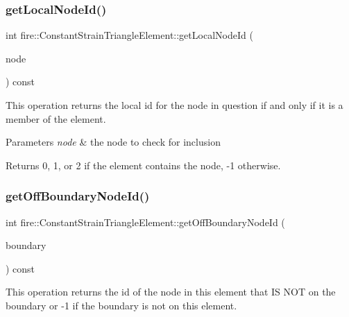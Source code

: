 \subsubsection{\texorpdfstring{get\+Local\+Node\+Id()}{getLocalNodeId()}}
{\footnotesize\ttfamily int fire\+::\+Constant\+Strain\+Triangle\+Element\+::get\+Local\+Node\+Id (\begin{DoxyParamCaption}\item[{const \hyperlink{a00195_a92dafcc05a788e1065a5792b67f0f70e}{Two\+D\+Node} \&}]{node }\end{DoxyParamCaption}) const}

This operation returns the local id for the node in question if and only if it is a member of the element. 
\begin{DoxyParams}{Parameters}
{\em node} & the node to check for inclusion \\
\hline
\end{DoxyParams}
\begin{DoxyReturn}{Returns}
0, 1, or 2 if the element contains the node, -\/1 otherwise. 
\end{DoxyReturn}
\mbox{\label{a00770_a6f65ab76e065f67fd5cef71e2e8c9628}} 
\subsubsection{\texorpdfstring{get\+Off\+Boundary\+Node\+Id()}{getOffBoundaryNodeId()}}
{\footnotesize\ttfamily int fire\+::\+Constant\+Strain\+Triangle\+Element\+::get\+Off\+Boundary\+Node\+Id (\begin{DoxyParamCaption}\item[{const \hyperlink{a00786}{Two\+D\+Robin\+Boundary\+Condition} \&}]{boundary }\end{DoxyParamCaption}) const}

This operation returns the id of the node in this element that IS N\+OT on the boundary or -\/1 if the boundary is not on this element. \mbox{\label{a00770_acf4734f5fbc56b700c29d637baf78b9f}} 
